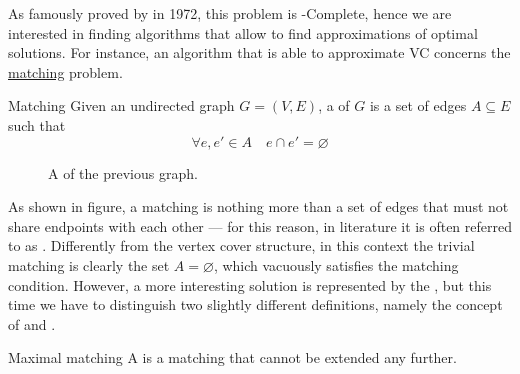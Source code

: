 \documentclass[a4paper, 12pt]{report}
\begin{document}
    As famously proved by \textcite{karp} in 1972, this problem is \NPclass-Complete, hence we are interested in finding algorithms that allow to find approximations of optimal solutions. For instance, an algorithm that is able to approximate VC concerns the \href{https://en.wikipedia.org/wiki/Matching_(graph_theory)}{matching} problem.

    \begin{frameddefn}{Matching}
        Given an undirected graph $G = (V, E)$, a  of $G$ is a set of edges $A \subseteq E$ such that $$\forall e, e' \in A \quad e \cap e' = \varnothing$$
    \end{frameddefn}

    \begin{figure}[H]
        \centering
        \caption{A  of the previous graph.}
        \label{matching}
    \end{figure}

    As shown in figure, a matching is nothing more than a set of edges that must not share endpoints with each other --- for this reason, in literature it is often referred to as . Differently from the vertex cover structure, in this context the trivial matching is clearly the set $A = \varnothing$, which vacuously satisfies the matching condition. However, a more interesting solution is represented by the , but this time we have to distinguish two slightly different definitions, namely the concept of  and .

    \begin{frameddefn}{Maximal matching}
        A  is a matching that cannot be extended any further.
    \end{frameddefn}
    
\end{document}
